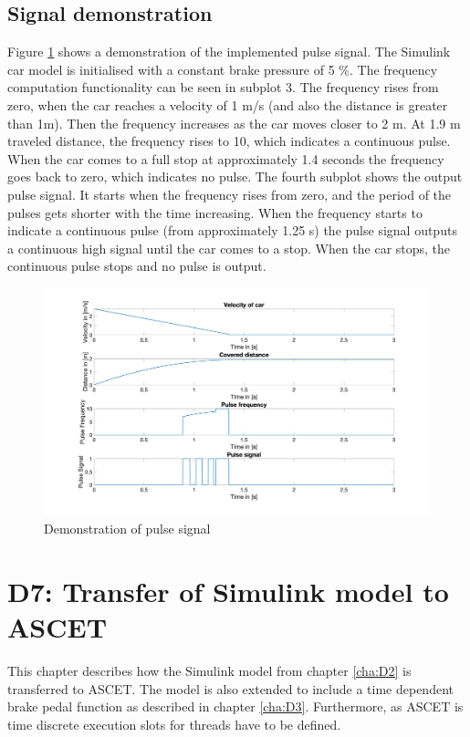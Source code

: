 \section{Signal demonstration}\label{sec:D6_SignalDemonstration}
Figure \ref{fig:D6_Result} shows a demonstration of the implemented pulse signal. The Simulink car model is initialised with a constant brake pressure of 5 \%. The frequency computation functionality can be seen in subplot 3. The frequency rises from zero, when the car reaches a velocity of 1 m/s (and also the distance is greater than 1m). Then the frequency increases as the car moves closer to 2 m. At 1.9 m traveled distance, the frequency rises to 10, which indicates a continuous pulse. When the car comes to a full stop at approximately 1.4 seconds the frequency goes back to zero, which indicates no pulse. The fourth subplot shows the output pulse signal. It starts when the frequency rises from zero, and the period of the pulses gets shorter with the time increasing. When the frequency starts to indicate a continuous pulse (from approximately 1.25 s) the pulse signal outputs a continuous high signal until the car comes to a stop. When the car stops, the continuous pulse stops and no pulse is output.

\begin{figure}[H]
\centering
\includegraphics[width=1\textwidth]{images/D6_result.jpg}
\caption{Demonstration of pulse signal}
\label{fig:D6_Result}
\end{figure}

\chapter{D7: Transfer of Simulink model to ASCET}\label{cha:D7}

This chapter describes how the Simulink model from chapter \ref{cha:D2} is transferred to ASCET. The model is also extended  to include a time dependent brake pedal function as described in chapter \ref{cha:D3}. Furthermore, as ASCET is time discrete execution slots for threads have to be defined.

